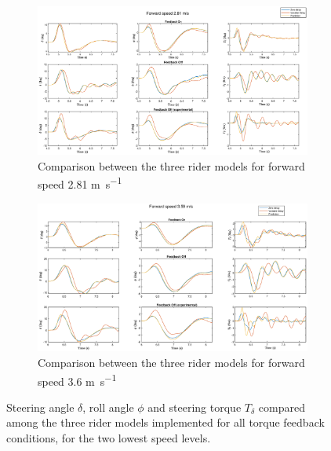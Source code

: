     \begin{figure}
        \centering
        \begin{subfigure}[b]{\textwidth}
            \centering
            \includegraphics[width=1\linewidth]{images/compare_models.eps}
            \caption{Comparison between the three rider models for forward speed 2.81 \si{\meter\per\second}}
            \label{fig:results_compare1}
        \end{subfigure}
        \begin{subfigure}[b]{\textwidth}
            \centering
            \includegraphics[width=1\linewidth]{images/compare_models2.eps}
            \caption{Comparison between the three rider models for forward speed 3.6 \si{\meter\per\second}}            
            \label{fig:results_compare2}
        \end{subfigure}
        \caption{Steering angle \ensuremath{\delta}, roll angle \ensuremath{\phi} and steering torque \ensuremath{T_\delta} compared among the three rider models implemented for all torque feedback conditions, for the two lowest speed levels.}
        \label{fig:results_compare12}
     \end{figure}



